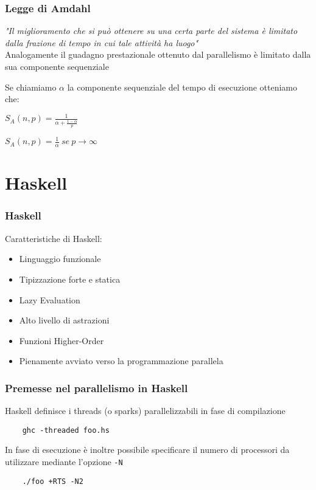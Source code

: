 \documentclass[14pt]{beamer}
\begin{document}

\begin{frame}
\frametitle{Legge di Amdahl}
\textit{"Il miglioramento che si può ottenere su una certa parte del sistema è limitato dalla frazione di tempo in cui tale attività ha luogo"}\\
Analogamente il guadagno prestazionale ottenuto dal parallelismo è limitato dalla sua componente sequenziale
\end{frame}


\begin{frame}
Se chiamiamo $\alpha$ la componente sequenziale del tempo di esecuzione otteniamo che:
\begin{center}
$\displaystyle S_{A}(n,p) = \frac{1}{\displaystyle \alpha + \frac{1-\alpha}{p}}$\\
\end{center}

\begin{center}
$\displaystyle S_A(n,p) = \frac{1}{\alpha} \ se \ p \rightarrow \infty$
\end{center}

\end{frame}

\section{Haskell}
\begin{frame}
\frametitle{Haskell}
Caratteristiche di Haskell:
\begin{itemize}
\item Linguaggio funzionale
\item Tipizzazione forte e statica
\item Lazy Evaluation
\item Alto livello di astrazioni
\item Funzioni Higher-Order
\item Pienamente avviato verso la programmazione parallela
\end{itemize}
\end{frame}


\begin{frame}[fragile]
\frametitle{Premesse nel parallelismo in Haskell}
Haskell definisce i threads (o sparks) parallelizzabili in fase di compilazione
\begin{verbatim}
    ghc -threaded foo.hs
\end{verbatim}
In fase di esecuzione è inoltre possibile specificare il numero di processori da utilizzare mediante l'opzione \texttt{-N}
\begin{verbatim}
    ./foo +RTS -N2
\end{verbatim}
\end{frame}
\end{document}

